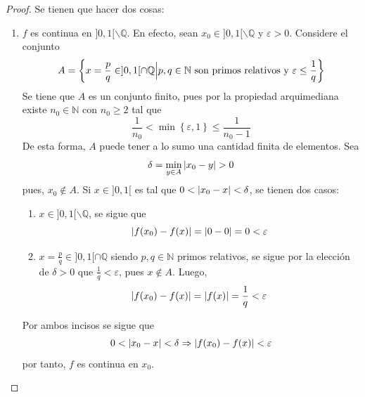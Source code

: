 \documentclass[12pt]{article}
\begin{document}
\begin{enumerate}
    \begin{proof}
        Se tienen que hacer dos cosas:
        \begin{enumerate}
            \item $f$ es continua en $]0,1[\backslash\mathbb{Q}$. En efecto, sean $x_0\in]0,1[\backslash\mathbb{Q}$ y $\varepsilon>0$. Considere el conjunto
            \begin{equation*}
                A=\left\{x=\frac{p}{q}\in]0,1[\cap\mathbb{Q}\Big|p,q\in\mathbb{N}\textup{ son primos relativos y }\varepsilon\leq\frac{1}{q} \right\}
            \end{equation*}
            Se tiene que $A$ es un conjunto finito, pues por la propiedad arquimediana existe $n_0\in\mathbb{N}$ con $n_0\geq 2$ tal que
            \begin{equation*}
                \frac{1}{n_0}<\min\left\{\varepsilon,1\right\}\leq\frac{1}{n_0-1}
            \end{equation*}
            De esta forma, $A$ puede tener a lo sumo una cantidad finita de elementos. Sea
            \begin{equation*}
                \delta=\min_{ y\in A}\abs{x_0-y}>0
            \end{equation*}
            pues, $x_0\notin A$. Si $x\in]0,1[$ es tal que $0<\left| x_0-x \right|<\delta$, se tienen dos casos:
            \begin{enumerate}
                \item $x\in]0,1[\backslash\mathbb{Q}$, se sigue que
                \begin{equation*}
                    \left| f(x_0)-f(x) \right|=\left| 0-0 \right|=0<\varepsilon
                \end{equation*}
                \item $x=\frac{p}{q}\in]0,1[\cap\mathbb{Q}$ siendo $p,q\in\mathbb{N}$ primos relativos, se sigue por la elección de $\delta>0$ que $\frac{1}{q}<\varepsilon$, pues $x\notin A$. Luego,
                \begin{equation*}
                    \left| f(x_0)-f(x) \right|=\left| f(x) \right|=\frac{1}{q}<\varepsilon
                \end{equation*}
            \end{enumerate}
            Por ambos incisos se sigue que
            \begin{equation*}
                0<\left| x_0-x \right|<\delta\Rightarrow\left| f(x_0)-f(x) \right|<\varepsilon
            \end{equation*}
            por tanto, $f$ es continua en $x_0$.


\end{enumerate}
\end{proof}
\end{enumerate}
\end{document}
